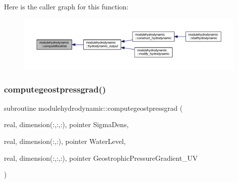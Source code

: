 Here is the caller graph for this function\+:\nopagebreak
\begin{figure}[H]
\begin{center}
\leavevmode
\includegraphics[width=350pt]{namespacemodulehydrodynamic_a3ccbfcaea30af1d03bc8f158f2262081_icgraph}
\end{center}
\end{figure}
\mbox{\label{namespacemodulehydrodynamic_a8db443c5e63483726ac4ce8b9729bbfa}} 
\subsubsection{\texorpdfstring{computegeostpressgrad()}{computegeostpressgrad()}}
{\footnotesize\ttfamily subroutine modulehydrodynamic\+::computegeostpressgrad (\begin{DoxyParamCaption}\item[{real, dimension(\+:,\+:,\+:), pointer}]{Sigma\+Dens,  }\item[{real, dimension(\+:,\+:), pointer}]{Water\+Level,  }\item[{real, dimension(\+:,\+:,\+:), pointer}]{Geostrophic\+Pressure\+Gradient\+\_\+\+UV }\end{DoxyParamCaption})\hspace{0.3cm}{\ttfamily [private]}}

